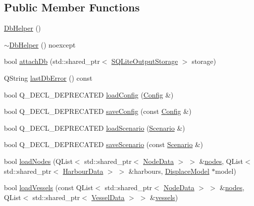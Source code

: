 \subsection*{Public Member Functions}
\begin{DoxyCompactItemize}
\item 
\mbox{\hyperlink{class_db_helper_ad5a6885723180ba8891634870af52a93}{Db\+Helper}} ()
\item 
\mbox{\hyperlink{class_db_helper_a1602442e5c1c0a55c5733ac52253fc05}{$\sim$\+Db\+Helper}} () noexcept
\item 
bool \mbox{\hyperlink{class_db_helper_a908260fddcd1fec10e10bdb551a710f8}{attach\+Db}} (std\+::shared\+\_\+ptr$<$ \mbox{\hyperlink{class_s_q_lite_output_storage}{S\+Q\+Lite\+Output\+Storage}} $>$ storage)
\item 
Q\+String \mbox{\hyperlink{class_db_helper_a969d9830aa0bf62dfc2740efe280311a}{last\+Db\+Error}} () const
\item 
bool Q\+\_\+\+D\+E\+C\+L\+\_\+\+D\+E\+P\+R\+E\+C\+A\+T\+ED \mbox{\hyperlink{class_db_helper_ad7def03594fbc3514f8cf118ee15d8a5}{load\+Config}} (\mbox{\hyperlink{class_config}{Config}} \&)
\item 
bool Q\+\_\+\+D\+E\+C\+L\+\_\+\+D\+E\+P\+R\+E\+C\+A\+T\+ED \mbox{\hyperlink{class_db_helper_a3b86278040357ab06d5988ee8a424a59}{save\+Config}} (const \mbox{\hyperlink{class_config}{Config}} \&)
\item 
bool Q\+\_\+\+D\+E\+C\+L\+\_\+\+D\+E\+P\+R\+E\+C\+A\+T\+ED \mbox{\hyperlink{class_db_helper_a90de247f0d65d1d6f07806ad12ea17dc}{load\+Scenario}} (\mbox{\hyperlink{class_scenario}{Scenario}} \&)
\item 
bool Q\+\_\+\+D\+E\+C\+L\+\_\+\+D\+E\+P\+R\+E\+C\+A\+T\+ED \mbox{\hyperlink{class_db_helper_ab77155de4a3599820b1c077f1b893098}{save\+Scenario}} (const \mbox{\hyperlink{class_scenario}{Scenario}} \&)
\item 
bool \mbox{\hyperlink{class_db_helper_a71be4973234a93536184797396dfd3af}{load\+Nodes}} (Q\+List$<$ std\+::shared\+\_\+ptr$<$ \mbox{\hyperlink{class_node_data}{Node\+Data}} $>$ $>$ \&\mbox{\hyperlink{thread__vessels_8cpp_ace5675146c8515428d094fd142d8a2d2}{nodes}}, Q\+List$<$ std\+::shared\+\_\+ptr$<$ \mbox{\hyperlink{class_harbour_data}{Harbour\+Data}} $>$ $>$ \&harbours, \mbox{\hyperlink{class_displace_model}{Displace\+Model}} $\ast$model)
\item 
bool \mbox{\hyperlink{class_db_helper_aaab0c72319c3007b41e56563bcc8539e}{load\+Vessels}} (const Q\+List$<$ std\+::shared\+\_\+ptr$<$ \mbox{\hyperlink{class_node_data}{Node\+Data}} $>$ $>$ \&\mbox{\hyperlink{thread__vessels_8cpp_ace5675146c8515428d094fd142d8a2d2}{nodes}}, Q\+List$<$ std\+::shared\+\_\+ptr$<$ \mbox{\hyperlink{class_vessel_data}{Vessel\+Data}} $>$ $>$ \&\mbox{\hyperlink{thread__vessels_8cpp_a5c62ccf0a525f019531241e5659bd511}{vessels}})

\end{DoxyCompactItemize}
